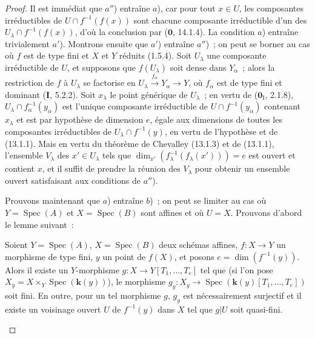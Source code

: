 \begin{proof}
Il est immédiat que $a''$) entraîne $a$), car pour tout $x\in U$, les
composantes irréductibles de $U\cap f^{-1}(f(x))$ sont chacune composante
irréductible d'un des $U_\lambda\cap f^{-1}(f(x))$, d'où la conclusion par
($\mathbf 0$, 14.1.4). La condition $a$) entraîne trivialement $a'$).
Montrons ensuite que $a'$) entraîne $a''$)~; on peut se borner au cas où $f$
est de type fini et $X$ et $Y$ réduits (1.5.4). Soit $U_\lambda$ une
composante irréductible de $U$, et supposons que $f(U_\lambda)$ soit dense
dans $Y_\alpha$~; alors la restriction de $f$ à $U_\lambda$ se factorise en
$U_\lambda\xrightarrow{f_\alpha}Y_\alpha\to Y$, où $f_\alpha$ est de type
fini et dominant (\textbf{I}, 5.2.2). Soit $x_\lambda$ le point générique de
$U_\lambda$~; en vertu de ($\mathbf 0_{\mathrm I}$, 2.1.8),
$U_\lambda\cap f_\alpha^{-1}(y_\alpha)$ est l'unique composante irréductible
de $U\cap f^{-1}(y_\alpha)$ contenant $x_\lambda$ et est par hypothèse de
dimension $e$, égale aux dimensions de toutes les composantes irréductibles
de $U_\lambda\cap f^{-1}(y)$, en vertu de l'hypothèse et de (13.1.1). Mais en
vertu du théorème de Chevalley (13.1.3) et de (13.1.1), l'ensemble $V_\lambda$
des $x'\in U_\lambda$ tels que
$\dim_{x'}(f_\lambda^{-1}(f_\lambda(x')))=e$ est ouvert et contient $x$, et il
suffit de prendre la réunion des $V_\lambda$ pour obtenir un ensemble ouvert
satisfaisant aux conditions de $a''$).

Prouvons maintenant que $a$) entraîne $b$)~; on peut se limiter au cas où
$Y=\operatorname{Spec}(A)$ et $X=\operatorname{Spec}(B)$ sont affines et où
$U=X$. Prouvons d'abord le lemme suivant~:

\begin{lemma}[13.3.1.1]
\label{IV.13.3.1.1-fr}
Soient $Y=\operatorname{Spec}(A)$, $X=\operatorname{Spec}(B)$ deux schémas
affines, $f:X\to Y$ un morphisme de type fini, $y$ un point de $f(X)$, et
posons $e=\dim(f^{-1}(y))$. Alors il existe un $Y$-morphisme
$g:X\to Y[T_1,\ldots,T_e]$ tel que (si l'on pose
$X_y=X\times_Y\operatorname{Spec}(\boldsymbol{k}(y))$), le morphisme
$g_y:X_y\to\operatorname{Spec}(\boldsymbol{k}(y)[T_1,\ldots,T_e])$ soit fini. En outre,
pour un tel morphisme $g$, $g_y$ est nécessairement surjectif et il existe un
voisinage ouvert $U$ de $f^{-1}(y)$ dans $X$ tel que $g|U$ soit quasi-fini.
\end{lemma}


\end{proof}
